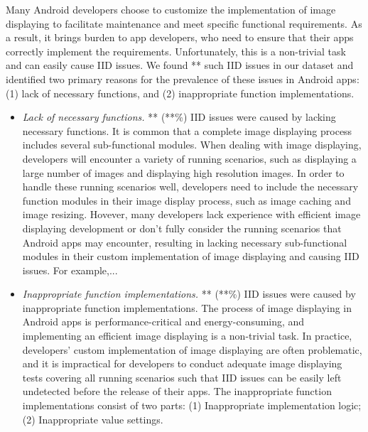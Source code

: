 Many Android developers choose to customize the implementation of image displaying to facilitate maintenance and meet specific functional requirements. 
As a result, it brings burden to app developers, who need to ensure that their apps correctly implement the requirements. Unfortunately, this is a non-trivial task and can easily cause IID issues. 
We found ** such IID issues in our dataset and identified two primary reasons for the prevalence of these issues in Android apps: (1) lack of necessary functions, and (2) inappropriate function implementations.

\begin{itemize}  
		
	\item \emph{Lack of necessary functions.} 
	** (**\%) IID issues were caused by lacking necessary functions. It is common that a complete image displaying process includes several sub-functional modules. When dealing with image displaying, developers will encounter a variety of running scenarios, such as displaying a large number of images and displaying high resolution images. In order to handle these running scenarios well, developers need to include the necessary function modules in their image display process, such as image caching and image resizing. Hovever, many developers lack experience with efficient image displaying development or don't fully consider the running scenarios that Android apps may encounter, resulting in lacking necessary sub-functional modules in their custom implementation of image displaying and causing IID issues. For example,...
	
	
	\item \emph{Inappropriate function implementations.}
    ** (**\%) IID issues were caused by inappropriate function implementations. The process of image displaying in Android apps is performance-critical and energy-consuming, and implementing an efficient image displaying is a non-trivial task. 
    In practice, developers' custom implementation of image displaying are often problematic, and it is impractical for developers to conduct adequate image displaying tests covering all running scenarios such that IID issues can be easily left undetected before the release of their apps. The inappropriate function implementations consist of two parts: (1) Inappropriate implementation logic; (2) Inappropriate value settings.
    
	
\end{itemize}

